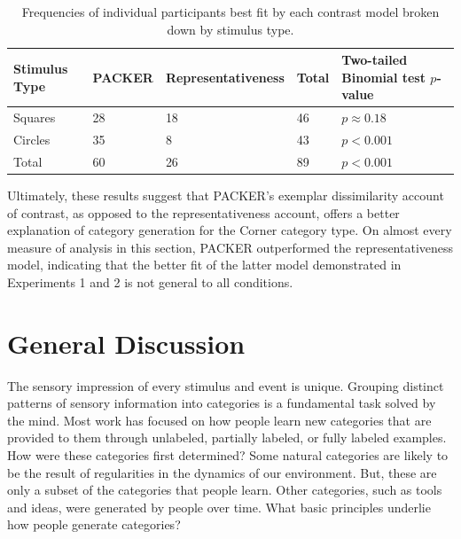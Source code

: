 \documentclass[pdflatex,sn-apa]{sn-jnl}%
\theoremstyle{thmstyleone}%
\theoremstyle{thmstyletwo}%
\theoremstyle{thmstylethree}%
\begin{document}
\begin{table} \centering
  \caption{Frequencies of individual participants best fit by each contrast
    model  broken down by stimulus type.}
\label{table:corner_counts}
\begin{tabular}{ l l l l l} \\ Stimulus Type & \textbf{PACKER} &
                                                               \textbf{Representativeness}& Total & Two-tailed Binomial test $p$-value \\
  \hline 
  Squares & 28 & 18 & 46 & $p \approx 0.18$\\
  Circles & 35 &  8 & 43 & $p < 0.001$\\
  Total   & 60 & 26 & 89 & $p < 0.001$\\
\end{tabular}
\end{table}

Ultimately, these results suggest that PACKER's exemplar dissimilarity account
of contrast, as opposed to the representativeness account, offers a better
explanation of category generation for the Corner category type. On almost every
measure of analysis in this section, PACKER outperformed the representativeness
model, indicating that the better fit of the latter model demonstrated in
Experiments 1 and 2 is not general to all conditions.

\section{General Discussion}
The sensory impression of every stimulus and event is unique. Grouping distinct
patterns of sensory information into categories is a fundamental task solved by
the mind. Most work has focused on how people learn new categories that are
provided to them through unlabeled, partially labeled, or fully labeled
examples. How were these categories first determined? Some natural categories
are likely to be the result of regularities in the dynamics of our environment.
But, these are only a subset of the categories that people learn. Other
categories, such as tools and ideas, were generated by people over time. What
basic principles underlie how people generate categories?
\end{document}
